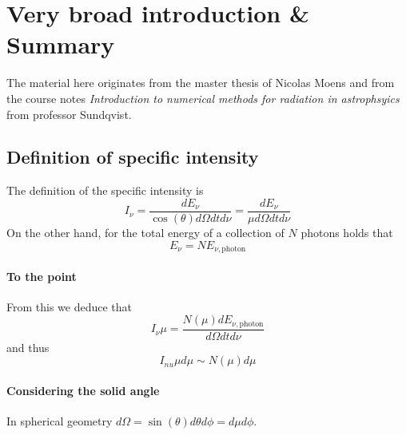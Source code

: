 \documentclass[../main/main.tex]{subfiles}
\begin{document}
\section{Very broad introduction \& Summary}
The material here originates from the master thesis of Nicolas Moens \cite{MoensNicolas} and from the course notes \textit{Introduction to numerical methods for radiation in astrophsyics} from professor Sundqvist. 

\subsection{Definition of specific intensity}
\label{specific_intensity}
The definition of the specific intensity is 
\begin{equation}
I_{\nu} 
	= \frac{dE_{\nu}}{\cos(\theta) d\Omega dt d\nu} 
	= \frac{dE_{\nu}}{\mu d\Omega dt d\nu} 
\end{equation}
On the other hand, for the total energy of a collection of $N$ photons holds that 
\begin{equation}
E_{\nu} = N E_{\nu,\text{photon}} 
\end{equation}

\paragraph{To the point}
From this we deduce that 
\begin{equation}
I_{\nu} \mu  = \frac{N(\mu) dE_{\nu,\text{photon}}}{d\Omega dt d\nu}
\end{equation}
and thus 
\begin{equation}
\boxed{I_{nu} \mu d\mu \sim N(\mu) d\mu}
\end{equation}

\paragraph{Considering the solid angle}
In spherical geometry $d\Omega = \sin(\theta) d\theta d\phi = d\mu d\phi$.
\end{document}
